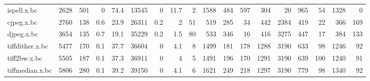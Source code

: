 \begin{tabular}{lrrrrrrrrrrrrrrrrr}
 ispell.x.bc          &     2628 &  501 &    0   &     74.4 &   13545 &    0   &     11.7 &     2 &    1588 &  484 &   597 &   304 &    20 &   965 &     54 &      1328 &       0 \\
 cjpeg.x.bc           &     2760 &  138 &    0.6 &     23.9 &   26311 &    0.2 &      2   &    51 &     519 &  285 &    34 &   442 &  2384 &   419 &     22 &       366 &     169 \\
 djpeg.x.bc           &     3654 &  135 &    0.7 &     19.1 &   35229 &    0.2 &      1.5 &    80 &     533 &  346 &    16 &   416 &  3275 &   447 &     17 &       384 &     133 \\
 tiffdither.x.bc      &     5477 &  170 &    0.1 &     37.7 &   36604 &    0   &      4.1 &     8 &    1499 &  181 &   178 &  1288 &  3190 &   633 &     98 &      1246 &      92 \\
 tiff2bw.x.bc         &     5505 &  187 &    0.1 &     37.3 &   36911 &    0   &      4   &     5 &    1491 &  196 &   170 &  1291 &  3190 &   639 &    100 &      1240 &      91 \\
 tiffmedian.x.bc      &     5806 &  280 &    0.1 &     39.2 &   39150 &    0   &      4.1 &     6 &    1621 &  249 &   218 &  1297 &  3190 &   779 &     98 &      1340 &      92 \\
\hline
\end{tabular}